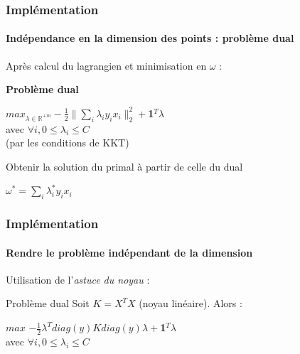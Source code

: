 \documentclass{beamer}
\begin{document}
\begin{frame}
\frametitle{Implémentation}
\framesubtitle{Indépendance en la dimension des points : \textbf{problème dual}}

Après calcul du lagrangien et minimisation en $\omega$ : 

\pause

\begin{block}{\textbf{Problème dual}}
             \begin{center}
             $max_{\lambda \in \mathbb{R}^{+m}} -\frac{1}{2}\|\sum_i\lambda_iy_ix_i\|^2_2 + $\textbf{1}$^T\lambda$\\ 
             avec $\forall i, 0 \leq \lambda_i \leq C$\\
             (par les conditions de KKT)
             \end{center}
\end{block}

\pause

\begin{alertblock}{Obtenir la solution du primal à partir de celle du dual}
             \begin{center}
               $\omega^{*} = \sum_i \lambda^{*}_i y_i x_i$
             \end{center}
\end{alertblock}

\end{frame}

\begin{frame}
\frametitle{Implémentation}
\framesubtitle{Rendre le problème indépendant de la dimension}

Utilisation de l'\emph{astuce du noyau} :

\bigskip

\begin{block}{Problème dual}
Soit $K = X^TX$ (noyau linéaire). Alors :

\bigskip
                 \begin{center}
                 $max$ $-\frac{1}{2}\lambda^Tdiag(y)Kdiag(y)\lambda+$\textbf{1}$^T\lambda$\\
                 avec $\forall i, 0 \leq \lambda_i \leq C$ 
                 \end{center}
\end{block}

\end{frame}
\end{document}
